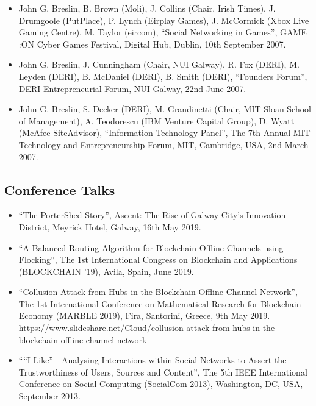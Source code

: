 \documentclass[10pt,a4paper]{res} %
\begin{document}
\begin{resume}
\begin{itemize}
\item John G. Breslin, B. Brown (Moli), J. Collins (Chair, Irish Times), J. Drumgoole (PutPlace), P. Lynch (Eirplay Games), J. McCormick (Xbox Live Gaming Centre), M. Taylor (eircom), ``Social Networking in Games'', GAME :ON Cyber Games Festival, Digital Hub, Dublin, 10th September 2007.
\item John G. Breslin, J. Cunningham (Chair, NUI Galway), R. Fox (DERI), M. Leyden (DERI), B. McDaniel (DERI), B. Smith (DERI), ``Founders Forum'', DERI Entrepreneurial Forum, NUI Galway, 22nd June 2007.
\item John G. Breslin, S. Decker (DERI), M. Grandinetti (Chair, MIT Sloan School of Management), A. Teodorescu (IBM Venture Capital Group), D. Wyatt (McAfee SiteAdvisor), ``Information Technology Panel'', The 7th Annual MIT Technology and Entrepreneurship Forum, MIT, Cambridge, USA, 2nd March 2007.
\end{itemize}

\subsection*{Conference Talks}

\begin{itemize} \itemsep -2pt
\item ``The PorterShed Story'', Ascent: The Rise of Galway City’s Innovation District, Meyrick Hotel, Galway, 16th May 2019.
\item ``A Balanced Routing Algorithm for Blockchain Offline Channels using Flocking'', The 1st International Congress on Blockchain and Applications (BLOCKCHAIN '19), Avila, Spain, June 2019.
\item ``Collusion Attack from Hubs in the Blockchain Offline Channel Network'', The 1st International Conference on Mathematical Research for Blockchain Economy (MARBLE 2019), Fira, Santorini, Greece, 9th May 2019. \url{https://www.slideshare.net/Cloud/collusion-attack-from-hubs-in-the-blockchain-offline-channel-network}
\item ````I Like'' - Analysing Interactions within Social Networks to Assert the Trustworthiness of Users, Sources and Content'', The 5th IEEE International Conference on Social Computing (SocialCom 2013), Washington, DC, USA, September 2013.
\end{itemize}
 

\end{resume}
\end{document}

